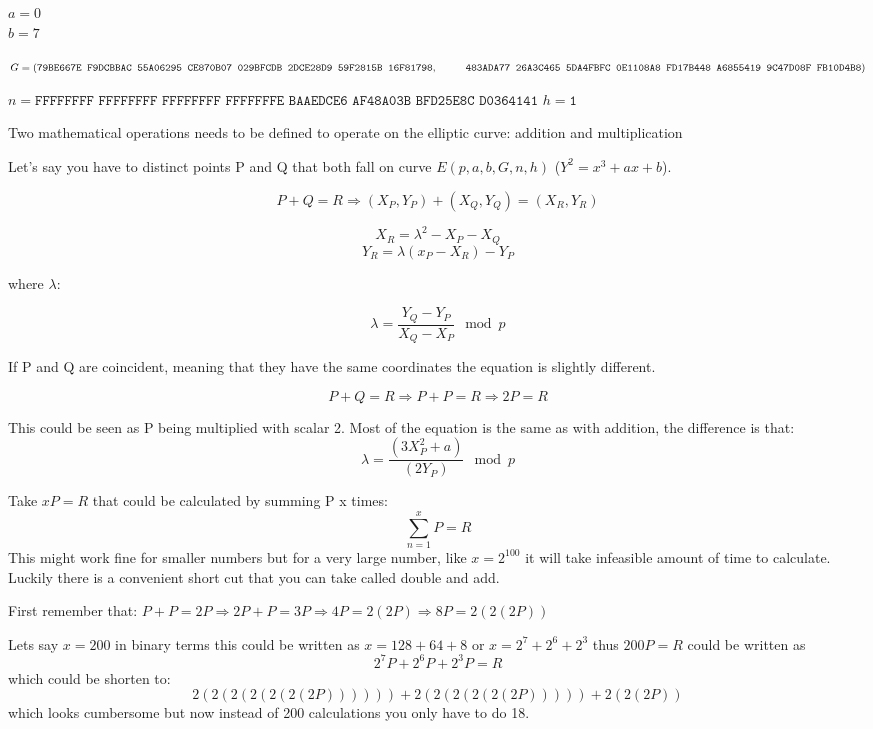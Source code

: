 $a=0$\\
$b=7$

$G=(\texttt{79BE667E F9DCBBAC 55A06295 CE870B07 029BFCDB 2DCE28D9 59F2815B 16F81798},\\ \null\qquad\:\:\: \texttt{483ADA77 26A3C465 5DA4FBFC 0E1108A8 FD17B448 A6855419 9C47D08F FB10D4B8})$


$n=\texttt{FFFFFFFF FFFFFFFF FFFFFFFF FFFFFFFE BAAEDCE6 AF48A03B BFD25E8C D0364141}$
$h=\texttt{1}$

Two mathematical operations needs to be defined to operate on the elliptic curve: addition and multiplication

Let's say you have to distinct points P and Q that both fall on curve $E(p,a,b,G,n,h)$ ($Y^2=x^3+ax+b$). 

$$P+Q=R \Rightarrow (X_P, Y_P) + (X_Q, Y_Q) = (X_R, Y_R)$$

$$X_R = \lambda^2-X_P-X_Q$$
$$Y_R = \lambda(x_P-X_R) -Y_P$$

where $\lambda$:

$$\lambda = \frac{Y_Q-Y_P}{X_Q - X_P} \mod p$$

If P and Q are coincident, meaning that they have the same coordinates the equation is slightly different. 

$$P+Q=R \Rightarrow P+P=R \Rightarrow 2P=R$$ 

This could be seen as P being multiplied with scalar 2. Most of the equation is the same as with addition, the difference is that:\\
$$\lambda = \frac{(3X^2_P + a)}{(2Y_P)} \mod p$$

Take $xP=R$ that could be calculated by summing P x times:
$$\sum_{n=1}^{x} P = R$$
This might work fine for smaller numbers but for a very large number, like $x=2^{100}$ it will take infeasible amount of time to calculate. Luckily there is a convenient short cut that you can take called double and add. 

First remember that: $P+P = 2P \Rightarrow 2P + P = 3P \Rightarrow 4P = 2(2P) \Rightarrow 8P = 2(2(2P))$

Lets say $x=200$ in binary terms this could be written as $x=128+64+8$ or $x=2^7+2^6+2^3$ thus $200P=R$ could be written as $$2^7P+2^6P+2^3P=R$$ which could be shorten to: $$2(2(2(2(2(2(2P)))))) + 2(2(2(2(2(2P))))) + 2(2(2P))$$ which looks cumbersome but now instead of 200 calculations you only have to do 18.



